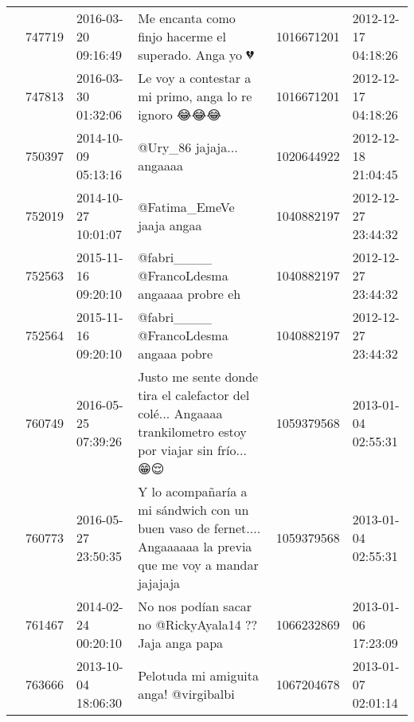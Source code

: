 \begin{tabular}{llllrl}
           & 747719  & 2016-03-20 09:16:49 &                                                                                         Me encanta como finjo hacerme el superado. Anga yo 💔 &  1016671201 & 2012-12-17 04:18:26 \\
           & 747813  & 2016-03-30 01:32:06 &                                                                                         Le voy a contestar a mi primo, anga lo re ignoro 😂😂😂 &  1016671201 & 2012-12-17 04:18:26 \\
           & 750397  & 2014-10-09 05:13:16 &                                                                                                                    @Ury\_86 jajaja... angaaaa &  1020644922 & 2012-12-18 21:04:45 \\
           & 752019  & 2014-10-27 10:01:07 &                                                                                                                    @Fatima\_EmeVe jaaja angaa &  1040882197 & 2012-12-27 23:44:32 \\
           & 752563  & 2015-11-16 09:20:10 &                                                                                                  @fabri\_\_\_\_ @FrancoLdesma  angaaaa probre eh &  1040882197 & 2012-12-27 23:44:32 \\
           & 752564  & 2015-11-16 09:20:10 &                                                                                                        @fabri\_\_\_\_ @FrancoLdesma angaaa pobre &  1040882197 & 2012-12-27 23:44:32 \\
           & 760749  & 2016-05-25 07:39:26 &                                    Justo me sente donde tira el calefactor del colé... Angaaaa trankilometro estoy por viajar sin frío... 😁😌 &  1059379568 & 2013-01-04 02:55:31 \\
           & 760773  & 2016-05-27 23:50:35 &                               Y lo acompañaría a mi sándwich con un buen vaso de fernet.... Angaaaaaa la previa que me voy a mandar jajajaja &  1059379568 & 2013-01-04 02:55:31 \\
           & 761467  & 2014-02-24 00:20:10 &                                                                                       No nos podían sacar no @RickyAyala14 ?? Jaja anga papa &  1066232869 & 2013-01-06 17:23:09 \\
           & 763666  & 2013-10-04 18:06:30 &                                                                                                       Pelotuda mi amiguita anga! @virgibalbi &  1067204678 & 2013-01-07 02:01:14 \\

\end{tabular}

